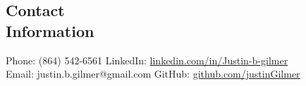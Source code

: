 \documentclass[margin,line]{resume}
\begin{document}
\begin{resume}
\section{\mysidestyle Contact\\Information}

Phone: (864) 542-6561           \hfill LinkedIn: \url{linkedin.com/in/Justin-b-gilmer}\\
\noindent Email: justin.b.gilmer@gmail.com  \hfill GitHub: \url{github.com/justinGilmer}\vspace{0mm}\\\vspace{-4.5mm}

 


\end{resume}
\end{document}
